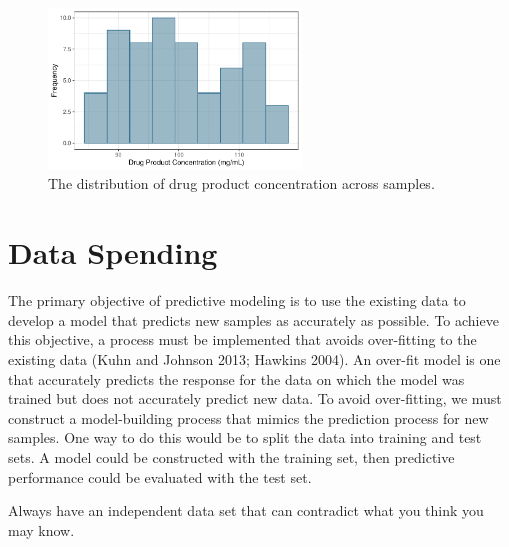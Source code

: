 \documentclass[
  letterpaper,
  DIV=11,
  numbers=noendperiod]{scrartcl}
\begin{document}
\begin{figure}[t!]

{\centering \includegraphics[width=0.6\textwidth,height=\textheight]{figures/fig-concentration-1.pdf}

}

\caption{\label{fig-concentration}The distribution of drug product
concentration across samples.}

\end{figure}

\hypertarget{data-spending}{%
\section{Data Spending}\label{data-spending}}

The primary objective of predictive modeling is to use the existing data
to develop a model that predicts new samples as accurately as possible.
To achieve this objective, a process must be implemented that avoids
over-fitting to the existing data (Kuhn and Johnson 2013; Hawkins 2004).
An over-fit model is one that accurately predicts the response for the
data on which the model was trained but does not accurately predict new
data. To avoid over-fitting, we must construct a model-building process
that mimics the prediction process for new samples. One way to do this
would be to split the data into training and test sets. A model could be
constructed with the training set, then predictive performance could be
evaluated with the test set.

\begin{tcolorbox}[enhanced jigsaw, title=\textcolor{quarto-callout-important-color}{\faExclamation}\hspace{0.5em}{\textbf{WTF} \#5}, rightrule=.15mm, leftrule=.75mm, bottomtitle=1mm, opacityback=0, opacitybacktitle=0.6, bottomrule=.15mm, arc=.35mm, colframe=quarto-callout-important-color-frame, breakable, toprule=.15mm, toptitle=1mm, colback=white, titlerule=0mm, coltitle=black, left=2mm, colbacktitle=quarto-callout-important-color!10!white]

Always have an independent data set that can contradict what you think
you may know.

\end{tcolorbox}
\end{document}
